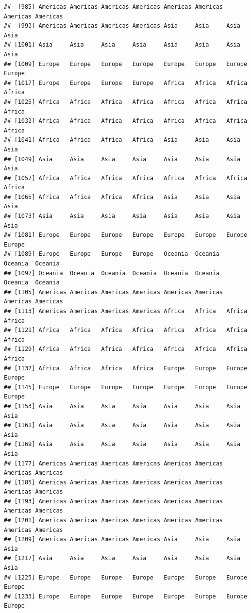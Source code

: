 \documentclass[
]{article}
\begin{document}
\begin{verbatim}
##  [985] Americas Americas Americas Americas Americas Americas Americas Americas
##  [993] Americas Americas Americas Americas Asia     Asia     Asia     Asia    
## [1001] Asia     Asia     Asia     Asia     Asia     Asia     Asia     Asia    
## [1009] Europe   Europe   Europe   Europe   Europe   Europe   Europe   Europe  
## [1017] Europe   Europe   Europe   Europe   Africa   Africa   Africa   Africa  
## [1025] Africa   Africa   Africa   Africa   Africa   Africa   Africa   Africa  
## [1033] Africa   Africa   Africa   Africa   Africa   Africa   Africa   Africa  
## [1041] Africa   Africa   Africa   Africa   Asia     Asia     Asia     Asia    
## [1049] Asia     Asia     Asia     Asia     Asia     Asia     Asia     Asia    
## [1057] Africa   Africa   Africa   Africa   Africa   Africa   Africa   Africa  
## [1065] Africa   Africa   Africa   Africa   Asia     Asia     Asia     Asia    
## [1073] Asia     Asia     Asia     Asia     Asia     Asia     Asia     Asia    
## [1081] Europe   Europe   Europe   Europe   Europe   Europe   Europe   Europe  
## [1089] Europe   Europe   Europe   Europe   Oceania  Oceania  Oceania  Oceania 
## [1097] Oceania  Oceania  Oceania  Oceania  Oceania  Oceania  Oceania  Oceania 
## [1105] Americas Americas Americas Americas Americas Americas Americas Americas
## [1113] Americas Americas Americas Americas Africa   Africa   Africa   Africa  
## [1121] Africa   Africa   Africa   Africa   Africa   Africa   Africa   Africa  
## [1129] Africa   Africa   Africa   Africa   Africa   Africa   Africa   Africa  
## [1137] Africa   Africa   Africa   Africa   Europe   Europe   Europe   Europe  
## [1145] Europe   Europe   Europe   Europe   Europe   Europe   Europe   Europe  
## [1153] Asia     Asia     Asia     Asia     Asia     Asia     Asia     Asia    
## [1161] Asia     Asia     Asia     Asia     Asia     Asia     Asia     Asia    
## [1169] Asia     Asia     Asia     Asia     Asia     Asia     Asia     Asia    
## [1177] Americas Americas Americas Americas Americas Americas Americas Americas
## [1185] Americas Americas Americas Americas Americas Americas Americas Americas
## [1193] Americas Americas Americas Americas Americas Americas Americas Americas
## [1201] Americas Americas Americas Americas Americas Americas Americas Americas
## [1209] Americas Americas Americas Americas Asia     Asia     Asia     Asia    
## [1217] Asia     Asia     Asia     Asia     Asia     Asia     Asia     Asia    
## [1225] Europe   Europe   Europe   Europe   Europe   Europe   Europe   Europe  
## [1233] Europe   Europe   Europe   Europe   Europe   Europe   Europe   Europe  

\end{verbatim}
\end{document}
